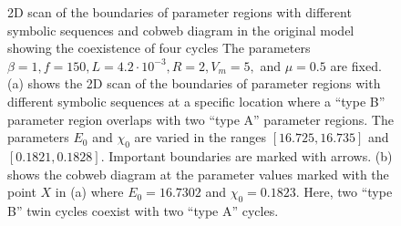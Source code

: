 \begin{figure}
	\centering
	\caption[2D scan of the boundaries of parameter regions with different symbolic sequences and cobweb diagram in the original model showing the coexistence of four cycles]{
		2D scan of the boundaries of parameter regions with different symbolic sequences and cobweb diagram in the original model showing the coexistence of four cycles
		The parameters $\beta = 1, f = 150, L = 4.2 \cdot 10^{-3}, R = 2, V_m = 5,$ and $\mu = 0.5$ are fixed.
		(a) shows the 2D scan of the boundaries of parameter regions with different symbolic sequences at a specific location where a ``type B'' parameter region overlaps with two ``type A'' parameter regions.
		The parameters $E_0$ and $\chi_0$ are varied in the ranges $[16.725, 16.735]$ and $[0.1821, 0.1828]$.
		Important boundaries are marked with arrows.
		(b) shows the cobweb diagram at the parameter values marked with the point $X$ in (a) where $E_0 = 16.7302$ and $\chi_0 = 0.1823$.
		Here, two ``type B'' twin cycles coexist with two ``type A'' cycles.
	}
\end{figure}

